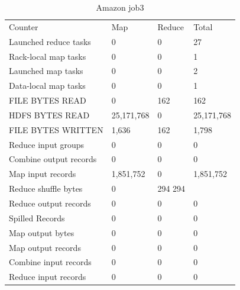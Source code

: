 \documentclass[paper=a4, fontsize=11pt]{scrartcl}	%
\numberwithin{equation}{section}															%
\numberwithin{figure}{section}																%
\numberwithin{table}{section}																%
\begin{document}
\begin{table}[]
	\centering
	\caption{Amazon job3}
	\label{my-label}
	\begin{tabular}{llll}
		Counter&	Map&	Reduce&	Total\\
		Launched reduce tasks&	0&	0&	27\\
		Rack-local map tasks&	0&	0&	1\\
		Launched map tasks&	0&	0&	2\\
		Data-local map tasks&	0&	0&	1\\
		FILE BYTES READ&	0&	162&	162\\
		HDFS BYTES READ&	25,171,768&	0&	25,171,768\\
		FILE BYTES WRITTEN&	1,636&	162&	1,798\\
		Reduce input groups&	0&	0&	0\\
		Combine output records&	0&	0&	0\\
		Map input records&	1,851,752&	0&	1,851,752\\
		Reduce shuffle bytes&	0&	294	294\\
		Reduce output records&	0&	0&	0\\
		Spilled Records&	0&	0&	0\\
		Map output bytes&	0&	0&	0\\
		Map output records&	0&	0&	0\\
		Combine input records&	0&	0&	0\\
		Reduce input records&	0&	0&	0\\
	\end{tabular}
\end{table}
\end{document}
